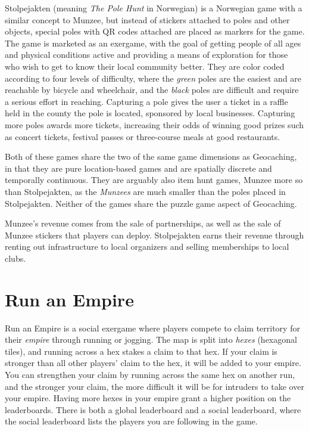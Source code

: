 Stolpejakten (meaning \emph{The Pole Hunt} in Norwegian) is a Norwegian game with a similar concept to Munzee, but instead of stickers attached to poles and other objects, special poles with QR codes attached are placed as markers for the game. The game is marketed as an exergame, with the goal of getting people of all ages and physical conditions active and providing a means of exploration for those who wish to get to know their local community better. They are color coded according to four levels of difficulty, where the \emph{green} poles are the easiest and are reachable by bicycle and wheelchair, and the \emph{black} poles are difficult and require a serious effort in reaching. Capturing a pole gives the user a ticket in a raffle held in the county the pole is located, sponsored by local businesses. Capturing more poles awards more tickets, increasing their odds of winning good prizes such as concert tickets, festival passes or three-course meals at good restaurants.

Both of these games share the two of the same game dimensions as Geocaching, in that they are pure location-based games and are spatially discrete and temporally continuous. They are arguably also item hunt games, Munzee more so than Stolpejakten, as the \emph{Munzees} are much smaller than the poles placed in Stolpejakten. Neither of the games share the puzzle game aspect of Geocaching.

Munzee's revenue comes from the sale of partnerships, as well as the sale of Munzee stickers that players can deploy. Stolpejakten earns their revenue through renting out infrastructure to local organizers and selling memberships to local clubs.

\section{Run an Empire}

Run an Empire is a social exergame where players compete to claim territory for their \emph{empire} through running or jogging. The map is split into \emph{hexes} (hexagonal tiles), and running across a hex stakes a claim to that hex. If your claim is stronger than all other players' claim to the hex, it will be added to your empire. You can strengthen your claim by running across the same hex on another run, and the stronger your claim, the more difficult it will be for intruders to take over your empire. Having more hexes in your empire grant a higher position on the leaderboards. There is both a global leaderboard and a social leaderboard, where the social leaderboard lists the players you are following in the game.

